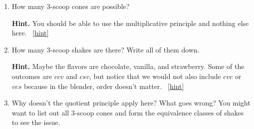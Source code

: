\documentclass{book}
\begin{document}
\setcounter{project}{119}
\addtocounter{project}{-1}
\begin{activity}[]\label{activity-112}
\begin{enumerate}[font=\bfseries,label=(\alph*),ref=\alph*]
\item\label{task-152} \hypertarget{p-817}{}%
How many 3-scoop cones are possible?%
\par\smallskip%
\noindent\textbf{Hint.}\hypertarget{hint-78}{}\quad%
\hypertarget{p-818}{}%
You should be able to use the multiplicative principle and nothing else here.%
~\hfill{\tiny\hyperlink{a-119.a}{[hint]}\hypertarget{q-119.a}{}}\item\label{task-153} \hypertarget{p-819}{}%
How many 3-scoop shakes are there?  Write all of them down.%
\par\smallskip%
\noindent\textbf{Hint.}\hypertarget{hint-79}{}\quad%
\hypertarget{p-820}{}%
Maybe the flavors are chocolate, vanilla, and strawberry.  Some of the outcomes are \(ccv\) and \(csv\), but notice that we would not also include \(cvc\) or \(vcs\) because in the blender, order doesn't matter.%
~\hfill{\tiny\hyperlink{a-119.b}{[hint]}\hypertarget{q-119.b}{}}\item\label{task-154} \hypertarget{p-821}{}%
Why doesn't the quotient principle apply here?  What goes wrong?  You might want to list out all 3-scoop cones and form the equivalence classes of shakes to see the issue.%
\end{enumerate}
\end{activity}

\clearpage
\end{document}
